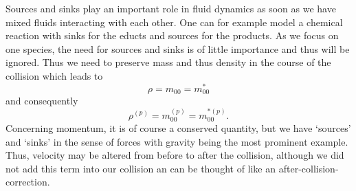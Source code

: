 Sources and sinks play an important role in fluid dynamics as soon as we have mixed fluids interacting with each other.
One can for example model a chemical reaction with sinks for the educts and sources for the products.
As we focus on one species, the need for sources and sinks is of little importance and thus will be ignored.
Thus we need to preserve mass and thus density in the course of the collision which leads to
\begin{equation}
    \rho  = m_{00} = m_{00}^*
\end{equation}
and consequently
\begin{equation}
    \rho^{(p)} = m_{00}^{(p)} = m_{00}^{*(p)}.
\end{equation}
Concerning momentum, it is of course a conserved quantity, but we have `sources' and `sinks' in the sense of forces with gravity being the most prominent example.
Thus, velocity may be altered from before to after the collision, although we did not add this term into our collision an can be thought of like an after-collision-correction.
